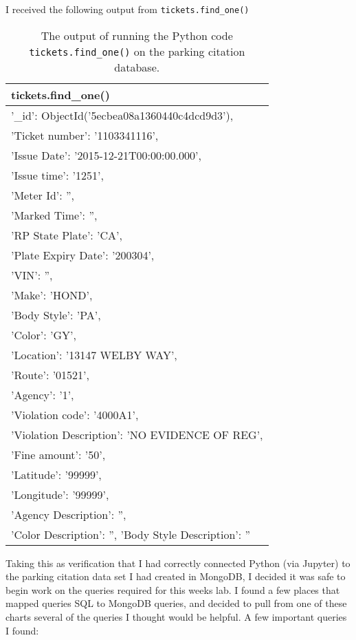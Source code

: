 \documentclass[]{article}
\newcommand{\code}[1]{\colorbox{light-gray}{\texttt{#1}}}
\begin{document}
I received the following output from \code{tickets.find\_one()}
\pagebreak
\begin{table}[!ht]
	\begin{center}
		\caption{The output of running the Python code \code{tickets.find\_one()} on the parking citation database.}
		\label{tab:table1}
		\begin{tabular}{|l|} 
			\hline
			\textbf{tickets.find\_one()} \\
			\hline
'\_id': ObjectId('5ecbea08a1360440c4dcd9d3'),\\
	'Ticket number': '1103341116',\\
	'Issue Date': '2015-12-21T00:00:00.000',\\
	'Issue time': '1251',\\
	'Meter Id': '',\\
	'Marked Time': '',\\
	'RP State Plate': 'CA',\\
	'Plate Expiry Date': '200304',\\
	'VIN': '',\\
	'Make': 'HOND',\\
	'Body Style': 'PA',\\
	'Color': 'GY',\\
	'Location': '13147 WELBY WAY',\\
	'Route': '01521',\\
	'Agency': '1',\\
	'Violation code': '4000A1',\\
	'Violation Description': 'NO EVIDENCE OF REG',\\
	'Fine amount': '50',\\
	'Latitude': '99999',\\
	'Longitude': '99999',\\
	'Agency Description': '',\\
	'Color Description': '',
	'Body Style Description': ''\\
			\hline
		\end{tabular}
	\end{center}
\end{table}

Taking this as verification that I had correctly connected Python (via Jupyter) to the parking citation data set I had created in MongoDB, I decided it was safe to begin work on the queries required for this weeks lab.  I found a few places that mapped queries SQL to MongoDB queries, and decided to pull from one of these charts several of the queries I thought would be helpful.  A few important queries I found:
\end{document}

